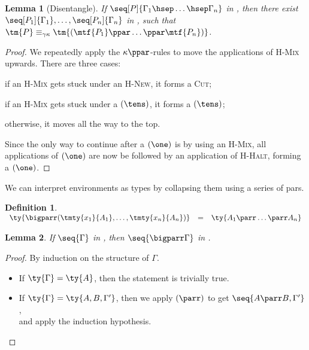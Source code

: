 \documentclass[submission,copyright,creativecommons]{eptcs}
\newtheorem{definition}{Definition}
\newtheorem{lemma}{Lemma}
\begin{document}
\begin{lemma}[Disentangle]\label{lem:hcp-disentangle}
  If $\seq[P]{\Gamma_1 \hsep \dots \hsep \Gamma_n}$ in \hcp,
  then there exist $\seq[P_1]{\Gamma_1}, \dots, \seq[P_n]{\Gamma_n}$ in \cp,
  such that
  $\tm{P}\equiv_{\gamma\kappa}\tm{(\mtf{P_1}\ppar\dots\ppar\mtf{P_n})}$.
\end{lemma}
\begin{proof}  
  We repeatedly apply the $\kappa{\ppar}$-rules to move the applications of
  \textsc{H-Mix} upwards. There are three cases:
  \begin{enumerate*}[label={\alph*)}]
  \item if an \textsc{H-Mix} gets stuck under an \textsc{H-New}, it forms a
    \textsc{Cut};
  \item if an \textsc{H-Mix} gets stuck under a $(\tens)$, it forms a \cp
    $(\tens)$;
  \item otherwise, it moves all the way to the top.
  \end{enumerate*}
  Since the only way to continue after a $(\one)$ is by using an \textsc{H-Mix},
  all applications of $(\one)$ are now be followed by an application of
  \textsc{H-Halt}, forming a \cp $(\one)$.
\end{proof}

We can interpret environments as types by collapsing them using a series of
pars.
\begin{definition}\label{def:bigparr}
  \(
  \begin{array}{lcl}
    \ty{\bigparr(\tmty{x_1}{A_1} , \dots , \tmty{x_n}{A_n})}
    & = & \ty{A_1 \parr \dots \parr A_n}
  \end{array}
  \)
\end{definition}

\begin{lemma}\label{lem:cp-bigparr}
  If $\seq{\Gamma}$ in \cp, then $\seq{\bigparr\Gamma}$ in \cp.
\end{lemma}
\begin{proof}
  By induction on the structure of $\Gamma$.
  \begin{itemize}
  \item
    If $\ty{\Gamma} = \ty{A}$, then the statement is trivially true.
  \item
    If $\ty{\Gamma} = \ty{A, B, \Gamma'}$,
    then we apply $(\parr)$ to get $\seq{A \parr B, \Gamma'}$,\\
    and apply the induction hypothesis.
  \end{itemize}
\end{proof}
\end{document}
